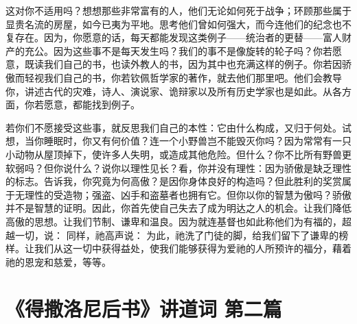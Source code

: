 这对你不适用吗？想想那些非常富有的人，他们无论如何死于战争；环顾那些属于显贵名流的房屋，如今已夷为平地。思考他们曾如何强大，而今连他们的纪念也不复存在。因为，你愿意的话，每天都能发现这类例子——统治者的更替——富人财产的充公。因为这些事不是每天发生吗？我们的事不是像旋转的轮子吗？你若愿意，既读我们自己的书，也读外教人的书，因为其中也充满这样的例子。你若因骄傲而轻视我们自己的书，你若钦佩哲学家的著作，就去他们那里吧。他们会教导你，讲述古代的灾难，诗人、演说家、诡辩家以及所有历史学家也是如此。从各方面，你若愿意，都能找到例子。\par

若你们不愿接受这些事，就反思我们自己的本性：它由什么构成，又归于何处。试想，当你睡眠时，你又有何价值？连一个小野兽岂不能毁灭你吗？因为常常有一只小动物从屋顶掉下，使许多人失明，或造成其他危险。但什么？你不比所有野兽更软弱吗？但你说什么？说你以理性见长？看，你并没有理性：因为骄傲是缺乏理性的标志。告诉我，你究竟为何高傲？是因你身体良好的构造吗？但此胜利的奖赏属于无理性的受造物；强盗、凶手和盗墓者也拥有它。但你以你的智慧为傲吗？骄傲并不是智慧的证明。因此，你首先使自己失去了成为明达之人的机会。让我们降低高傲的思想。让我们节制、谦卑和温良。因为就连基督也如此称他们为有福的，超越一切，说： 同样，祂高声说： 为此，祂洗了门徒的脚，给我们留下了谦卑的榜样。让我们从这一切中获得益处，使我们能够获得为爱祂的人所预许的福分，藉着祂的恩宠和慈爱，等等。\par



\section{《得撒洛尼后书》讲道词 第二篇}

\par

\par

